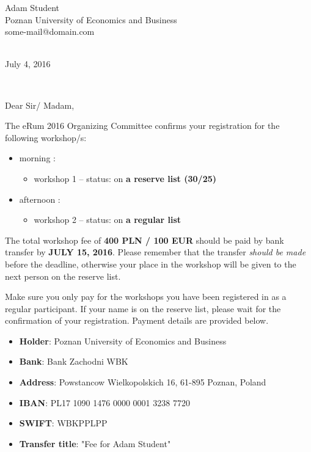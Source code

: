 \documentclass[10pt,a4paper]{letter}\usepackage[]{graphicx}\usepackage[]{color}
\def\opening#1{\thispagestyle{empty}
{\centering\fromaddress \vspace{0.6in} \\ %
\hspace*{\longindentation}July 4, 2016\hspace*{\fill}\par} %
{\raggedright \toname \\ \toaddress \par} %
\vspace{0.3in} %
\noindent #1 %
}
\begin{document}

\begin{letter} 
{Adam Student\\ 
Poznan University of Economics and Business \\
some-mail@domain.com \\ 
}


\opening{Dear Sir/ Madam,}

The eRum 2016 Organizing Committee confirms your registration for the following workshop/s:

\begin{itemize}
\item  morning : \begin{itemize}\item  workshop 1  -- status: on \textbf{ a reserve list (30/25) }
\end{itemize}\item  afternoon : \begin{itemize}\item  workshop 2  -- status: on \textbf{ a regular list }
\end{itemize}
\end{itemize}


\noindent The total workshop fee of \textbf{400 PLN / 100 EUR} should be paid by bank transfer by \textbf{JULY 15, 2016}. Please remember that the transfer \textit{should be made} before the deadline, otherwise your place in the workshop will be given to the next person on the reserve list. 

Make sure you only pay for the workshops you have been registered in as a regular participant. If your name is on the reserve list, please wait for the confirmation of your registration. Payment details are provided below.

\begin{itemize}
\itemsep0pt
\item \textbf{Holder}: Poznan University of Economics and Business 
\item \textbf{Bank}: Bank Zachodni WBK 
\item \textbf{Address}: Powstancow Wielkopolskich 16, 61-895 Poznan, Poland 
\item \textbf{IBAN}: PL17 1090 1476 0000 0001 3238 7720 
\item \textbf{SWIFT}: WBKPPLPP 
\item \textbf{Transfer title}: "Fee for Adam Student"
\end{itemize}


\end{letter}
\end{document}
